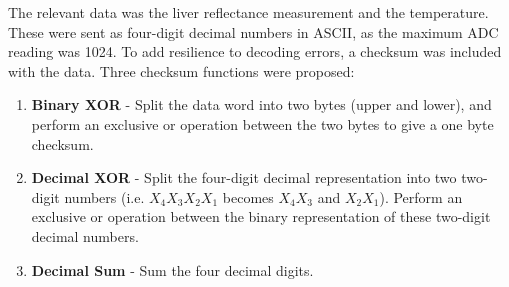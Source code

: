 The relevant data was the liver reflectance measurement and the temperature. These were sent as four-digit decimal numbers in ASCII, as the maximum ADC reading was 1024. To add resilience to decoding errors, a checksum was included with the data. Three checksum functions were proposed:
\begin{enumerate}
\item \label{check: binary xor} \textbf{Binary XOR} - Split the data word into two bytes (upper and lower), and perform an exclusive or operation between the two bytes to give a one byte checksum.
\item \label{check: decimal xor} \textbf{Decimal XOR} - Split the four-digit decimal representation into two two-digit numbers (i.e. $X_4X_3X_2X_1$ becomes $X_4X_3$ and $X_2X_1$). Perform an exclusive or operation between the binary representation of these two-digit decimal numbers.
\item \label{check: decimal sum} \textbf{Decimal Sum} - Sum the four decimal digits.
\end{enumerate}

